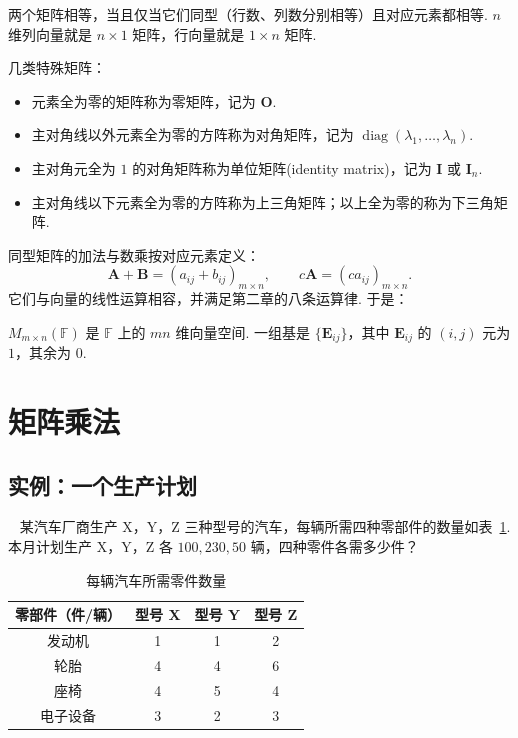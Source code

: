 \documentclass[lang=cn,10.5pt,scheme=chinese,toc=twocol,section,chinesefont=nofont,
twoside,citestyle=gb7714-2015,bibstyle=gb7714-2015]{elegantbook}
\DeclareRobustCommand{\textbf}[1]{{\lnsemiboldlatin\lnsemiboldcjk #1}}
\newcommand{\vv}[1]{\boldsymbol{#1}}
\numberwithin{equation}{section}   %
\newcommand{\diag}{\operatorname{diag}}
\newcommand*{\lnlabel}[1]{{\sffamily\bfseries\color{black}#1}}
\renewenvironment{problem}[1][]{%
	\refstepcounter{prob}%
	\par\noindent\lnlabel{\problemname\ \theprob\ifblank{#1}{}{\ #1}}\ \rmfamily}{%
	\par\ignorespacesafterend}
\begin{document}
两个矩阵相等，当且仅当它们\textbf{同型}（行数、列数分别相等）且对应元素都相等. $n$ 维列向量就是 $n\times1$ 矩阵，行向量就是 $1\times n$ 矩阵.

几类特殊矩阵：
\begin{itemize}
  \item 元素全为零的矩阵称为\textbf{零矩阵}，记为 $\vv{O}$.
  \item 主对角线以外元素全为零的方阵称为\textbf{对角矩阵}，记为 $\diag(\lambda_1,\ldots,\lambda_n)$.
  \item 主对角元全为 $1$ 的对角矩阵称为\textbf{单位矩阵}(identity matrix)，记为 $\vv{I}$ 或 $\vv I_n$.
  \item 主对角线以下元素全为零的方阵称为\textbf{上三角矩阵}；以上全为零的称为\textbf{下三角矩阵}.
\end{itemize}

同型矩阵的加法与数乘按对应元素定义：
\[
  \vv{A}+\vv{B}=(a_{ij}+b_{ij})_{m\times n},\qquad c\vv{A}=(ca_{ij})_{m\times n}.
\]
它们与向量的线性运算相容，并满足第二章的八条运算律. 于是：

\begin{corollary}
  $M_{m\times n}(\mathbb{F})$ 是 $\mathbb{F}$ 上的 $mn$ 维向量空间. 一组基是 $\{\vv E_{ij}\}$，其中 $\vv E_{ij}$ 的 $(i,j)$ 元为 $1$，其余为 $0$.
\end{corollary}

\section{矩阵乘法}

\subsection{实例：一个生产计划}

\begin{problem}
\label{prob:car}
某汽车厂商生产 X，Y，Z 三种型号的汽车，每辆所需四种零部件的数量如表~\ref{tab:carexample}. 本月计划生产 X，Y，Z 各 $100,230,50$ 辆，四种零件各需多少件？
\begin{table}[htbp]
  \centering
  \begin{tabular}{cccc}
    \toprule
    零部件（件/辆） & 型号 X & 型号 Y & 型号 Z \\
    \midrule
    发动机      & 1    & 1    & 2    \\
    轮胎       & 4    & 4    & 6    \\
    座椅       & 4    & 5    & 4    \\
    电子设备     & 3    & 2    & 3    \\
    \bottomrule
  \end{tabular}
  \caption{每辆汽车所需零件数量}
  \label{tab:carexample}
\end{table}
\end{problem}
\end{document}
